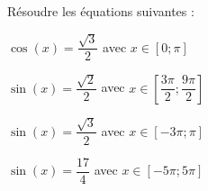 \documentclass[12pt,a4paper]{article}  %
\begin{document}

Résoudre les équations suivantes : 
\begin{enumMet}
    \item $\cos(x)=\dfrac{\sqrt{3}}{2}$ avec $x\in \left[0;\pi\right]$\quad {} \quad {}
    \item $\sin(x)=\dfrac{\sqrt{2}}{2}$ avec $x\in \left[\dfrac{3\pi}{2};\dfrac{9\pi}{2}\right]$ \quad {}\quad {}
    \item $\sin(x)=\dfrac{\sqrt{3}}{2}$ avec $x\in \left[-3\pi;\pi\right]$ \quad {} \quad {}
    \item $\sin(x)=\dfrac{17}{4}$ avec $x\in \left[-5\pi;5\pi\right]$ \quad {}\quad {}
\end{enumMet}
\end{document}
